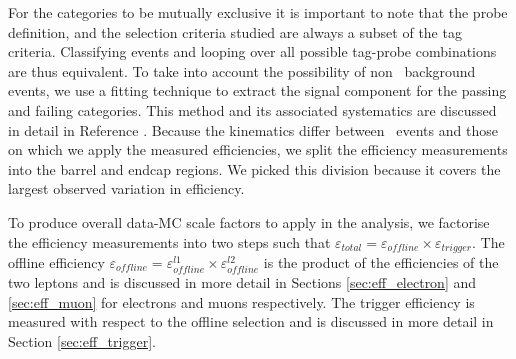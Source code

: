 For the categories to be mutually exclusive it is important to note that the probe definition, 
and the selection criteria studied are always a subset of the tag criteria.
Classifying events and looping over all possible tag-probe combinations are thus equivalent.
To take into account the possibility of non \dyll~background events, we use a fitting technique
to extract the signal component for the passing and failing categories. 
This method and its associated systematics are discussed in detail in Reference \cite{ref:tagprobe_mit_w}.
Because the kinematics differ between \dyll~events and those on which we apply the measured efficiencies,
we split the efficiency measurements into the barrel and endcap regions.
We picked this division because it covers the largest observed variation in efficiency.

To produce overall data-MC scale factors to apply in the analysis, we factorise the efficiency measurements
into two steps such that $\varepsilon_{total} = \varepsilon_{offline} \times \varepsilon_{trigger}$.
The offline efficiency $\varepsilon_{offline} = \varepsilon_{offline}^{l1} \times \varepsilon_{offline}^{l2}$
is the product of the efficiencies of the two leptons and is discussed in more detail in Sections \ref{sec:eff_electron}
and \ref{sec:eff_muon} for electrons and muons respectively.
The trigger efficiency is measured with respect to the offline selection and
 is discussed in more detail in Section \ref{sec:eff_trigger}.

